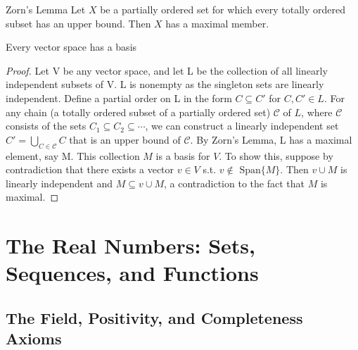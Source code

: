 \documentclass[a4paper,10pt]{book}
\theoremstyle{plain} %
\newcommand{\thistheoremname}{}
\newtheorem*{genericthm*}{\thistheoremname}
\newenvironment{namedthm*}[1]
	{\renewcommand{\thistheoremname}{#1}%
	\begin{genericthm*}}
	{\end{genericthm*}}
\begin{document}
\begin{flushleft}
\begin{namedthm*}{Zorn's Lemma}
	Let $X$ be a partially ordered set for which every totally ordered subset has an upper bound. Then $X$ has a maximal member.
\end{namedthm*}

\begin{namedthm*}{Every vector space has a basis}
\end{namedthm*}
\begin{proof}
Let V be any vector space, and let L be the collection of all linearly independent subsets of V. 
L is nonempty as the singleton sets are linearly independent. 
Define a partial order on L in the form $C \subseteq C'$ for $C,C' \in L$.
For any chain (a totally ordered subset of a partially ordered set) $\mathcal{C}$ of $L$, where $\mathcal{C}$ consists of the sets $C_1 \subseteq C_2 \subseteq \cdots$, we can construct a linearly independent set $C' = \bigcup_{C \in \mathcal{C}} C$ that is an upper bound of $\mathcal{C}$.
By Zorn's Lemma, L has a maximal element, say M.
This collection $M$ is a basis for $V$. To show this, suppose by contradiction that there exists a vector $v \in V$ s.t. $v \notin \text{ Span}\{M\}$.
Then $v \cup M$ is linearly independent and $M \subseteq v \cup M$, a contradiction to the fact that $M$ is maximal.
\end{proof}

\end{flushleft}

\chapter{The Real Numbers: Sets, Sequences, and Functions}

\section{The Field, Positivity, and Completeness Axioms}
\end{document}
